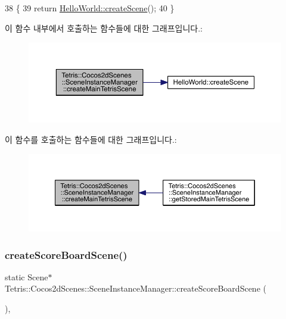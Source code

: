 \begin{DoxyCode}
38                                              \{
39             \textcolor{keywordflow}{return} \hyperlink{class_hello_world_a1b700f5f9de04271533d3fa099d7b014}{HelloWorld::createScene}();
40         \}
\end{DoxyCode}
이 함수 내부에서 호출하는 함수들에 대한 그래프입니다.\+:
\nopagebreak
\begin{figure}[H]
\begin{center}
\leavevmode
\includegraphics[width=350pt]{d1/d6f/class_tetris_1_1_cocos2d_scenes_1_1_scene_instance_manager_a536188c1cdb7cb46ebd2edc8ebf1f17a_cgraph}
\end{center}
\end{figure}
이 함수를 호출하는 함수들에 대한 그래프입니다.\+:
\nopagebreak
\begin{figure}[H]
\begin{center}
\leavevmode
\includegraphics[width=350pt]{d1/d6f/class_tetris_1_1_cocos2d_scenes_1_1_scene_instance_manager_a536188c1cdb7cb46ebd2edc8ebf1f17a_icgraph}
\end{center}
\end{figure}
\mbox{\label{class_tetris_1_1_cocos2d_scenes_1_1_scene_instance_manager_a159ac191291a7cc3575d6f5790df6646}} 
\subsubsection{\texorpdfstring{create\+Score\+Board\+Scene()}{createScoreBoardScene()}}
{\footnotesize\ttfamily static Scene$\ast$ Tetris\+::\+Cocos2d\+Scenes\+::\+Scene\+Instance\+Manager\+::create\+Score\+Board\+Scene (\begin{DoxyParamCaption}{ }\end{DoxyParamCaption})\hspace{0.3cm}{\ttfamily [inline]}, {\ttfamily [static]}}


